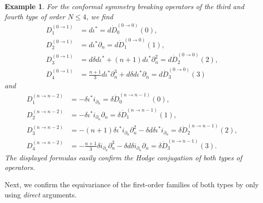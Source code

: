 \documentclass[a4paper,12pt,reqno]{amsart}
\newtheorem{example}[theorem]{Example}
\numberwithin{theorem}{subsection}
\numberwithin{equation}{section}
\begin{document}
\begin{example}\label{low-order-3-4-type} For the conformal symmetry breaking operators of the third
and fourth type of order $N \le 4$, we find
\begin{align*}
   D_1^{(0 \to 1)} & = d \iota^*  = d \dot{D}_0^{(0 \to 0)}(0), \\
   D_2^{(0 \to 1)} & = d \iota^* \partial_n = d \dot{D}_1^{(0 \to 0)}(1), \\
   D_3^{(0 \to 1)} & = d \delta d \iota^* + (n\!+\!1) d \iota^* \partial_n^2 = d \dot{D}_{2}^{(0 \to 0)}(2),  \\
   D_4^{(0 \to 1)} & = \frac{n\!+\!1}{3} d \iota^* \partial_n^3 + d \delta d \iota^*
   \partial_n = d \dot{D}_{3}^{(0 \to 0)}(3)
\end{align*}
and
\begin{align*}
   D_1^{(n \to n-2)} & = - \delta \iota^* i_{\partial_n} = \delta \dot{D}_0^{(n \to n-1)}(0), \\
   D_2^{(n \to n-2)} & = - \delta \iota^* i_{\partial_n} \partial_n = \delta \dot{D}_1^{(n \to n-1)}(1),  \\
   D_3^{(n \to n-2)} & = -(n\!+\!1) \delta \iota^* i_{\partial_n} \partial_n^2
   - \delta d \delta \iota^* i_{\partial_n} = \delta \dot{D}_2^{(n \to n-1)}(2), \\
   D_4^{(n \to n-2)} & = -\frac{n\!+\!1}{3} \delta i_{\partial_n} \partial_n^3
   - \delta d \delta i_{\partial_n} \partial_n = \delta \dot{D}_{3}^{(n \to n-1)}(3).
\end{align*}
The displayed formulas easily confirm the Hodge conjugation of both types of
operators.
\end{example}

Next, we confirm the equivariance of the first-order families of both types by
only using {\em direct} arguments.
\end{document}
